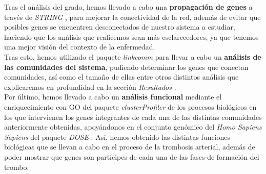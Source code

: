 Tras el análisis del grado, hemos llevado a cabo una \textbf{propagación de genes} a través de \textit{STRING} \cite{STRING}, para mejorar la conectividad de la red, además de evitar que posibles genes se encuentren desconectados de nuestro sistema a estudiar, haciendo que los análisis que realicemos sean más esclarecedores, ya que tenemos una mejor visión del contexto de la enfermedad. \\

Tras esto, hemos utilizado el paquete \textit{linkcomm} \cite{linkcomm} para llevar a cabo un \textbf{análisis de las comunidades del sistema}, pudiendo determinar los genes que conectan comunidades, así como el tamaño de ellas entre otros distintos análisis que explicaremos en profundidad en la sección \textit{Resultados} .\\

Por último, hemos llevado a cabo un \textbf{análisis funcional} mediante el enriquecimiento con GO del paquete \textit{clusterProfiler} \cite{clusterProfiler} de los procesos biológicos en los que intervienen los genes integrantes de cada una de las distintas comunidades anteriormente obtenidas, apoyándonos en el conjunto genómico del \textit{Homo Sapiens Sapiens} del paquete \textit{DOSE} \cite{DOSE}.  Así, hemos obtenido las distintas funciones biológicas que se llevan a cabo en el proceso de la trombosis arterial, además de poder mostrar que genes son partícipes de cada una de las fases de formación del trombo.
